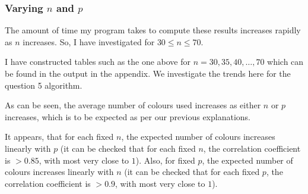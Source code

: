 \documentclass{article}
\begin{document}
\begin{center}
\end{center}

\newpage

\subsubsection{Varying $n$ and $p$}

The amount of time my program takes to compute these results increases rapidly as $n$ increases. So, I have investigated for $30 \leq n \leq 70$.

I have constructed tables such as the one above for $n=30,35,40,\dots,70$ which can be found in the output in the appendix. We investigate the trends here for the question 5 algorithm.



\begin{center}
	
\end{center}

As can be seen, the average number of colours used increases as either $n$ or $p$ increases, which is to be expected as per our previous explanations.

It appears, that for each fixed $n$, the expected number of colours increases linearly with $p$ (it can be checked that for each fixed $n$, the correlation coefficient is $>0.85$, with most very close to $1$). Also, for fixed $p$, the expected number of colours increases linearly with $n$ (it can be checked that for each fixed $p$, the correlation coefficient is $>0.9$, with most very close to $1$).
\end{document}
